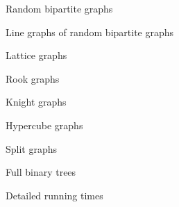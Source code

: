 %   

\begin{figure}
  \centering
  
  \caption{Random bipartite graphs}
  \label{plot:perf2Lines}
\end{figure}

\begin{figure}
  \centering
  
  \caption{Line graphs of random bipartite graphs}
  \label{plot:perf2Lines}
\end{figure}

\begin{figure}
  \centering
  
  \caption{Lattice graphs}
  \label{plot:gridLines}
\end{figure}

\begin{figure}
  \centering
  
  \caption{Rook graphs}
  \label{plot:rookLines}
\end{figure}

\begin{figure}
  \centering
  
  \caption{Knight graphs}
  \label{plot:knightLines}
\end{figure}

\begin{figure}
  \centering
  
  \caption{Hypercube graphs}
  \label{plot:hypercubeLines}
\end{figure}

\begin{figure}
  \centering
  
  \caption{Split graphs}
  \label{plot:splitLines}
\end{figure}

\begin{figure}
  \centering
  
  \caption{Full binary trees}
  \label{plot:splitLines}
\end{figure}

\begin{figure}
  \centering
  
  \caption{Detailed running times}
  \label{plot:perfDetailed}
\end{figure}

